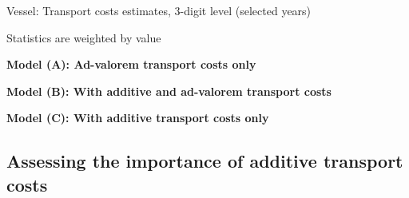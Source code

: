 \documentclass[a4paper,11pt]{article}
\begin{document}
\begin{table}[htbp]
	\centering
	\footnotesize{
		\caption{Vessel: Transport costs estimates, 3-digit level (selected years)}\vspace{5mm}
		\label{tab:result_ves_3d_detail}%
		
		\begin{tablenotes}
			\tiny
		\item Statistics are weighted by value
		\item \textbf{Model (A): Ad-valorem transport costs only}
		\item \textbf{Model (B): With additive and ad-valorem transport costs}
		\item \textbf{Model (C): With additive transport costs only}
		\end{tablenotes}
   }
\end{table}%


\subsection{Assessing the importance of additive transport costs \label{app:diagnostic_test}}
\end{document}
